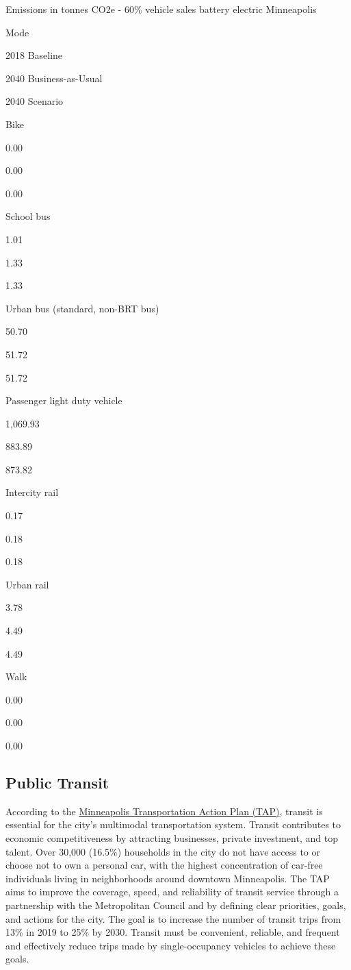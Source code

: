 \documentclass[
]{book}
\begin{document}
\label{tab:tab-bev-comp2}Emissions in tonnes CO2e - 60\% vehicle sales battery electric Minneapolis

Mode

2018 Baseline

2040 Business-as-Usual

2040 Scenario

Bike

0.00

0.00

0.00

School bus

1.01

1.33

1.33

Urban bus (standard, non-BRT bus)

50.70

51.72

51.72

Passenger light duty vehicle

1,069.93

883.89

873.82

Intercity rail

0.17

0.18

0.18

Urban rail

3.78

4.49

4.49

Walk

0.00

0.00

0.00

\hypertarget{public-transit}{%
\subsection{Public Transit}\label{public-transit}}

According to the \href{https://go.minneapolismn.gov/}{Minneapolis Transportation Action Plan (TAP)}, transit is essential for the city's multimodal transportation system. Transit contributes to economic competitiveness by attracting businesses, private investment, and top talent. Over 30,000 (16.5\%) households in the city do not have access to or choose not to own a personal car, with the highest concentration of car-free individuals living in neighborhoods around downtown Minneapolis. The TAP aims to improve the coverage, speed, and reliability of transit service through a partnership with the Metropolitan Council and by defining clear priorities, goals, and actions for the city. The goal is to increase the number of transit trips from 13\% in 2019 to 25\% by 2030. Transit must be convenient, reliable, and frequent and effectively reduce trips made by single-occupancy vehicles to achieve these goals.
\end{document}
